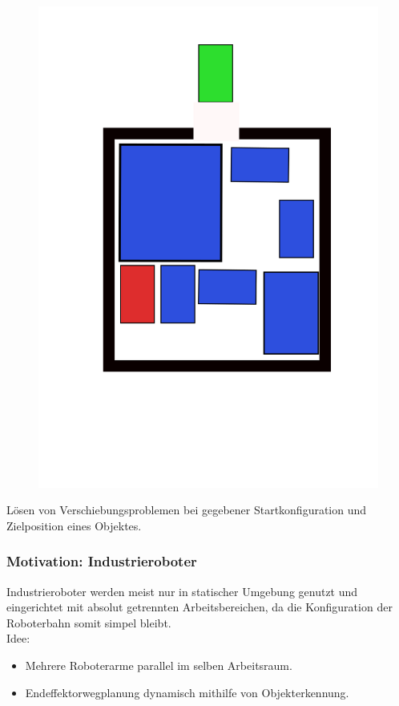 \documentclass[final]{beamer}
\begin{document}
\begin{frame}
\begin{figure}
\includegraphics[scale=0.1]{../thesis/boxriddle}
\end{figure}
Lösen von Verschiebungsproblemen bei gegebener Startkonfiguration und Zielposition eines Objektes.
\end{frame}


\begin{frame}
\frametitle{Motivation: Industrieroboter}
Industrieroboter werden meist nur in statischer Umgebung genutzt und eingerichtet mit absolut getrennten Arbeitsbereichen, da die Konfiguration der Roboterbahn somit simpel bleibt.\\
Idee:
\begin{itemize}
\item Mehrere Roboterarme parallel im selben Arbeitsraum.
\item Endeffektorwegplanung dynamisch mithilfe von Objekterkennung.
\end{itemize}
\end{frame}
\end{document}
